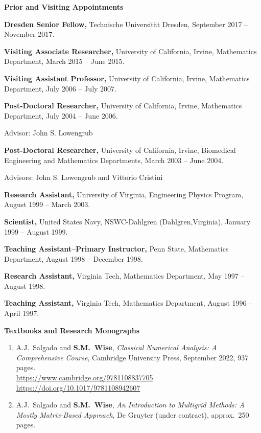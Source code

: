 \documentclass[11pt]{letter}
\begin{document}
	\smallskip

{\LARGE\bf  Prior and Visiting Appointments}
    \begin{description}    \item 
\textbf{Dresden Senior Fellow,} Technische Universit\"{a}t Dresden, September 2017 -- November 2017.
    \item 
\textbf{Visiting Associate Researcher,} University of California, Irvine,
Mathematics Department, March 2015 -- June 2015. 
    \item 
\textbf{Visiting Assistant Professor,} University of California, Irvine,
Mathematics Department, July 2006 -- July 2007.
    \item 
\textbf{Post-Doctoral Researcher,} University of California, Irvine, Mathematics Department, July 2004 -- June 2006.
    \begin{description}
    \item
Advisor: John S. Lowengrub
    \end{description}
    	\item 
\textbf{Post-Doctoral Researcher,} University of California, Irvine, Biomedical Engineering and Mathematics Departments, March 2003 -- June 2004.
    \begin{description}
    \item
Advisors: John S. Lowengrub and Vittorio Cristini
    \end{description}
	\item
\textbf{Research Assistant,} University of Virginia, Engineering Physics Program, August 1999 -- March 2003.
    \item
\textbf{Scientist,} United States Navy, NSWC-Dahlgren (Dahlgren,Virginia), January 1999 -- August 1999.
    \item
\textbf{Teaching Assistant--Primary Instructor,} Penn State, Mathematics Department, August 1998 -- December 1998.
    \item
\textbf{Research Assistant,} Virginia Tech, Mathematics Department, May 1997 -- August 1998.
    \item
\textbf{Teaching Assistant,} Virginia Tech, Mathematics Department, August 1996 -- April 1997.
    \end{description}


{\LARGE\bf  Textbooks and Research Monographs}
    \begin{enumerate}
    \item
A.J.~Salgado and \textbf{S.M.~Wise}, {\sl Classical Numerical Analysis: A Comprehensive Course}, Cambridge University Press, September 2022, 937 pages.
	\\
\url{https://www.cambridge.org/9781108837705}
	\\
\url{https://doi.org/10.1017/9781108942607}
    \item
A.J.~Salgado and \textbf{S.M.~Wise}, {\sl An Introduction to Multigrid Methods: A Mostly Matrix-Based Approach}, De Gruyter (under contract), approx.~250 pages.
    \end{enumerate}
\end{document}
